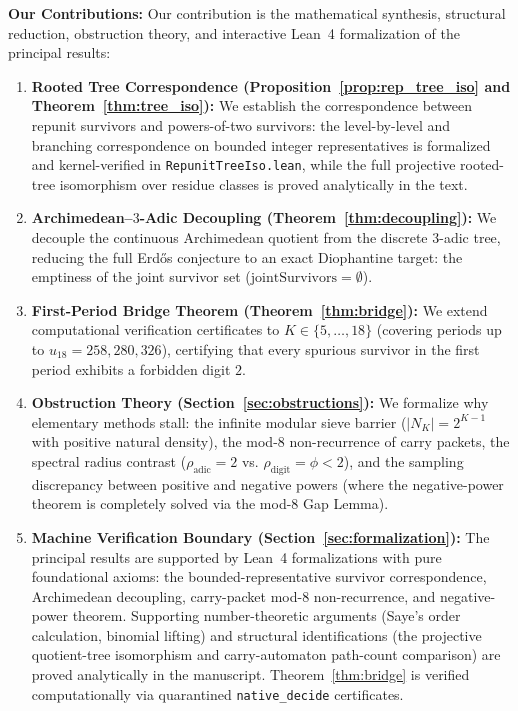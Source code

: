 \documentclass[11pt,reqno]{amsart}
\theoremstyle{plain}
\theoremstyle{definition}
\theoremstyle{remark}
\begin{document}
\textbf{Our Contributions:} Our contribution is the mathematical synthesis, structural reduction, obstruction theory, and interactive Lean~4 formalization of the principal results:
\begin{enumerate}
    \item \textbf{Rooted Tree Correspondence (Proposition~\ref{prop:rep_tree_iso} and Theorem~\ref{thm:tree_iso}):} We establish the correspondence between repunit survivors and powers-of-two survivors: the level-by-level and branching correspondence on bounded integer representatives is formalized and kernel-verified in
\texttt{RepunitTreeIso.lean}, while the full projective rooted-tree isomorphism over residue classes is proved analytically in the text.
    \item \textbf{Archimedean--$3$-Adic Decoupling (Theorem~\ref{thm:decoupling}):} We decouple the continuous Archimedean quotient from the discrete $3$-adic tree, reducing the full Erd\H{o}s conjecture to an exact Diophantine target: the emptiness of the joint survivor set ($\mathrm{jointSurvivors} = \emptyset$).
    \item \textbf{First-Period Bridge Theorem (Theorem~\ref{thm:bridge}):} We extend computational verification certificates to $K \in \{5, \dots, 18\}$ (covering periods up to $u_{18} = 258,280,326$), certifying that every spurious survivor in the first period exhibits a forbidden digit $2$.
    \item \textbf{Obstruction Theory (Section~\ref{sec:obstructions}):} We formalize why elementary methods stall: the infinite modular sieve barrier ($|N_K| = 2^{K-1}$ with positive natural density), the mod-$8$ non-recurrence of carry packets, the spectral radius contrast ($\rho_{\mathrm{adic}} = 2$ vs. $\rho_{\mathrm{digit}} = \phi < 2$), and the sampling discrepancy between positive and negative powers (where the negative-power theorem is completely solved via the mod-$8$ Gap Lemma).
    \item \textbf{Machine Verification Boundary (Section~\ref{sec:formalization}):} The principal results are supported by Lean~4 formalizations with pure foundational axioms: the bounded-representative survivor correspondence, Archimedean decoupling, carry-packet mod-$8$ non-recurrence, and negative-power theorem. Supporting number-theoretic arguments (Saye's order calculation, binomial lifting) and structural identifications (the projective quotient-tree isomorphism and carry-automaton path-count comparison) are proved analytically in the manuscript. Theorem~\ref{thm:bridge} is verified computationally via quarantined \texttt{native\_decide} certificates.
\end{enumerate}
\end{document}
